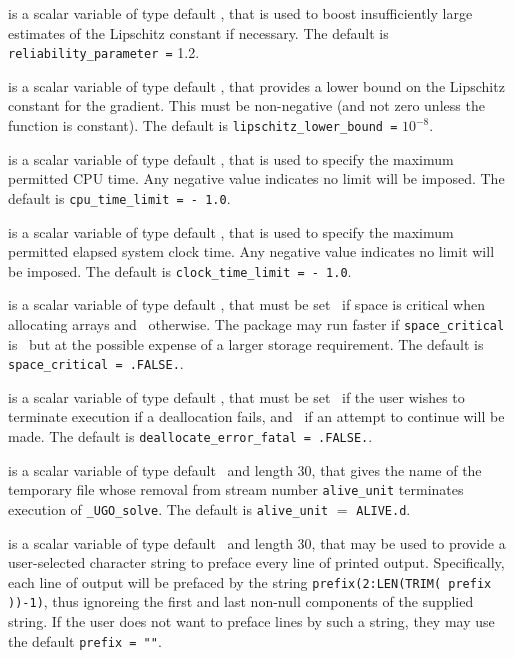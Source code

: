 \documentclass{galahad}
\newcommand{\packagename}{UGO}
\newcommand{\fullpackagename}{\libraryname\_\packagename}
\newcommand{\solver}{{\tt \fullpackagename\_solve}}
\begin{document}
\begin{description}
 is a scalar variable of type default \realdp,
that is used to boost insufficiently large estimates of the Lipschitz constant
if necessary.
The default is {\tt reliability\_parameter =} 1.2.

 is a scalar variable of type default \realdp,
that provides a lower bound on the Lipschitz constant for the gradient.
This must be non-negative (and not zero unless the function is constant).
The default is {\tt lipschitz\_lower\_bound =} $10^{-8}$.

 is a scalar variable of type default \realdp,
that is used to specify the maximum permitted CPU time. Any negative
value indicates no limit will be imposed. The default is
{\tt cpu\_time\_limit = - 1.0}.

 is a scalar variable of type default \realdp,
that is used to specify the maximum permitted elapsed system clock time.
Any negative value indicates no limit will be imposed. The default is
{\tt clock\_time\_limit = - 1.0}.

 is a scalar variable of type default \logical,
that must be set \true\ if space is critical when allocating arrays
and  \false\ otherwise. The package may run faster if
{\tt space\_critical} is \false\ but at the possible expense of a larger
storage requirement. The default is {\tt space\_critical = .FALSE.}.

 is a scalar variable of type default \logical,
that must be set \true\ if the user wishes to terminate execution if
a deallocation  fails, and \false\ if an attempt to continue
will be made. The default is {\tt deallocate\_error\_fatal = .FALSE.}.

 is a scalar variable of type default \character\ and length
30, that gives the name of the temporary file whose removal from stream number
{\tt alive\_unit} terminates execution of \solver.
The default is {\tt alive\_unit} $=$ {\tt ALIVE.d}.

 is a scalar variable of type default \character\
and length 30, that may be used to provide a user-selected
character string to preface every line of printed output.
Specifically, each line of output will be prefaced by the string
{\tt prefix(2:LEN(TRIM( prefix ))-1)},
thus ignoreing the first and last non-null components of the
supplied string. If the user does not want to preface lines by such
a string, they may use the default {\tt prefix = ""}.

\end{description}
\end{document}
